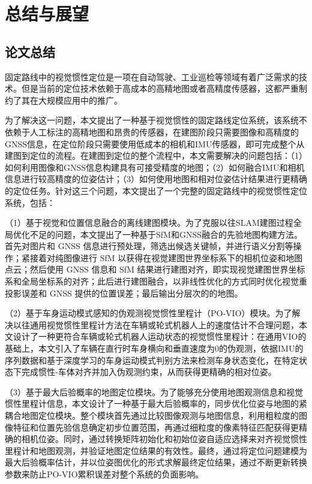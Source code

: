 \chapter{总结与展望}

\section{论文总结}

固定路线中的视觉惯性定位是一项在自动驾驶、工业巡检等领域有着广泛需求的技术。但是当前的定位技术依赖于高成本的高精地图或者高精度传感器，这都严重制约了其在大规模应用中的推广。

为了解决这一问题，本文提出了一种基于视觉惯性的固定路线定位系统，该系统不依赖于人工标注的高精地图和昂贵的传感器，在建图阶段只需要图像和高精度的GNSS信息，在定位阶段只需要使用低成本的相机和IMU传感器，即可完成整个从建图到定位的流程。在建图到定位的整个流程中，本文需要解决的问题包括：（1）如何利用图像和GNSS信息构建具有可接受精度的地图；（2）如何融合IMU和相机信息进行较高精度的位姿估计；（3）如何使用地图和相对位姿估计结果进行更精确的定位任务。针对这三个问题，本文提出了一个完整的固定路线中的视觉惯性定位系统，包括：

（1）基于视觉和位置信息融合的离线建图模块。为了克服以往SLAM建图过程全局优化不足的问题，本文提出了一种基于SfM和GNSS融合的先验地图构建方法。首先对图片和 GNSS 信息进行预处理，筛选出候选关键帧，并进行语义分割等操作；紧接着对纯图像进行 SfM 以获得在视觉建图世界坐标系下的相机位姿和地图点云；然后使用 GNSS 信息和 SfM 结果进行建图对齐，即实现视觉建图世界坐标系和全局坐标系的对齐；此后进行建图融合，以非线性优化的方式同时优化视觉重投影误差和 GNSS 提供的位置误差；最后输出分层次的的地图。

（2）基于车身运动模式感知的伪观测视觉惯性里程计（PO-VIO）模块。为了解决以往通用视觉惯性里程计方法在车辆或轮式机器人上的速度估计不合理问题，本文设计了一种更符合车辆或轮式机器人运动状态的视觉惯性里程计：在通用VIO的基础上，本文引入了车辆在直行时车身横向和垂直速度为0的伪观测，依据IMU的序列数据和基于深度学习的车身运动模式判别方法来检测车身状态变化，在特定状态下完成惯性-车体对齐并加入伪观测约束，从而获得更精确的相对位姿。

（3）基于最大后验概率的地图定位模块。为了能够充分使用地图观测信息和视觉惯性里程计信息，本文设计了一种基于最大后验概率的，同步优化位姿与地图的紧耦合地图定位模块。整个模块首先通过比较图像观测与地图信息，利用粗粒度的图像特征和位置先验信息确定初步位置范围，再通过细粒度的像素特征匹配获得更精确的相机位姿。同时，通过转换矩阵初始化和初始位姿自适应选择来对齐视觉惯性里程计和地图观测，并验证地图定位结果的有效性。最终，通过将定位问题建模为最大后验概率估计，并以位姿图优化的形式求解最终定位结果，通过不断更新转换参数来防止PO-VIO累积误差对整个系统的负面影响。

